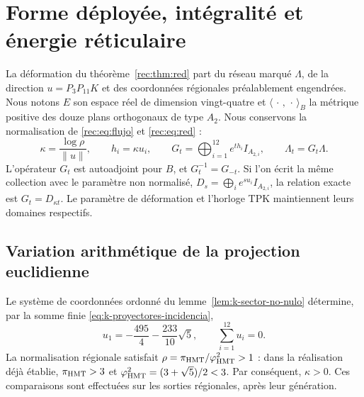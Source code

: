 \section{Forme déployée, intégralité et énergie réticulaire}
\label{corpus9:xii:forma-partida}

La déformation du théorème~\ref{rec:thm:red} part du réseau marqué
\(\Lambda\), de la direction \(u=P_3P_{11}K\) et des coordonnées
régionales préalablement engendrées. Nous notons \(E\) son espace réel
de dimension vingt-quatre et \(\langle\,\cdot\,,\,\cdot\,\rangle_B\)
la métrique positive des douze plans orthogonaux de type \(A_2\).
Nous conservons la normalisation de \eqref{rec:eq:flujo} et
\eqref{rec:eq:red} :
\begin{equation}
 \kappa=\frac{\log\rho}{\|u\|},\qquad h_i=\kappa u_i,
 \qquad
 G_t=\bigoplus_{i=1}^{12}e^{th_i}I_{A_{2,i}},\qquad
 \Lambda_t=G_t\Lambda.
 \label{corpus9:xii:normalizacion-flujo}
\end{equation}
L’opérateur \(G_t\) est autoadjoint pour \(B\), et
\(G_t^{-1}=G_{-t}\). Si l’on écrit la même collection avec le paramètre
non normalisé, \(D_s=\bigoplus_i e^{su_i}I_{A_{2,i}}\), la relation
exacte est \(G_t=D_{\kappa t}\). Le paramètre de déformation et
l’horloge TPK maintiennent leurs domaines respectifs.

\subsection{Variation arithmétique de la projection euclidienne}
\label{corpus9:xii:variacion-euclidea}

Le système de coordonnées ordonné du lemme~\ref{lem:k-sector-no-nulo} détermine,
par la somme finie \eqref{eq:k-proyectores-incidencia},
\begin{equation}
 u_1=-\frac{495}{4}-\frac{233}{10}\sqrt5,
 \qquad \sum_{i=1}^{12}u_i=0.
 \label{corpus9:xii:coordenada-testigo}
\end{equation}
La normalisation régionale satisfait \(\rho=\pi_{\mathrm{HMT}}/\varphi_{\mathrm{HMT}}^2>1\) :
dans la réalisation déjà établie, \(\pi_{\mathrm{HMT}}>3\) et
\(\varphi_{\mathrm{HMT}}^2=(3+\sqrt5)/2<3\). Par conséquent, \(\kappa>0\).
Ces comparaisons sont effectuées sur les sorties régionales, après
leur génération.

